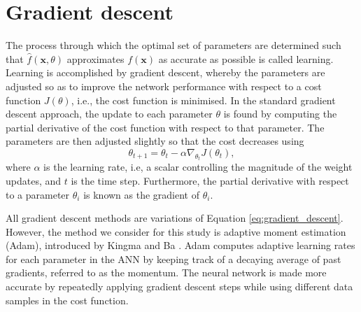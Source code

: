 \section{Gradient descent}\label{sec:grad_des}
The process through which the optimal set of parameters are determined such that $\hat{f}(\bm{x}, \theta)$ approximates $f(\bm{x})$ as accurate as possible is called learning.
Learning is accomplished by gradient descent, whereby the parameters are adjusted so as to improve the network performance with respect to a cost function $J(\theta)$, i.e., the cost function is minimised. 
In the standard gradient descent approach, the update to each parameter $\theta$ is found by computing the partial derivative of the cost function with respect to that parameter. 
The parameters are then adjusted slightly so that the cost decreases using
\begin{equation}
    \theta_{t+1} = \theta_{t} - \alpha \nabla_{\theta_t}J(\theta_t),
    \label{eq:gradient_descent}
\end{equation}
where $\alpha$ is the learning rate, i.e, a scalar controlling the magnitude of the weight updates, and $t$ is the time step. 
Furthermore, the partial derivative with respect to a parameter $\theta_i$ is known as the gradient of $\theta_i$. 

All gradient descent methods are variations of Equation \ref{eq:gradient_descent}.
However, the method we consider for this study is adaptive moment estimation (Adam), introduced by Kingma and Ba \cite{kingma2015}. 
Adam computes adaptive learning rates for each parameter in the ANN by keeping track of a decaying average of past gradients, referred to as the momentum. 
The neural network is made more accurate by repeatedly applying gradient descent steps while using different data samples in the cost function.


